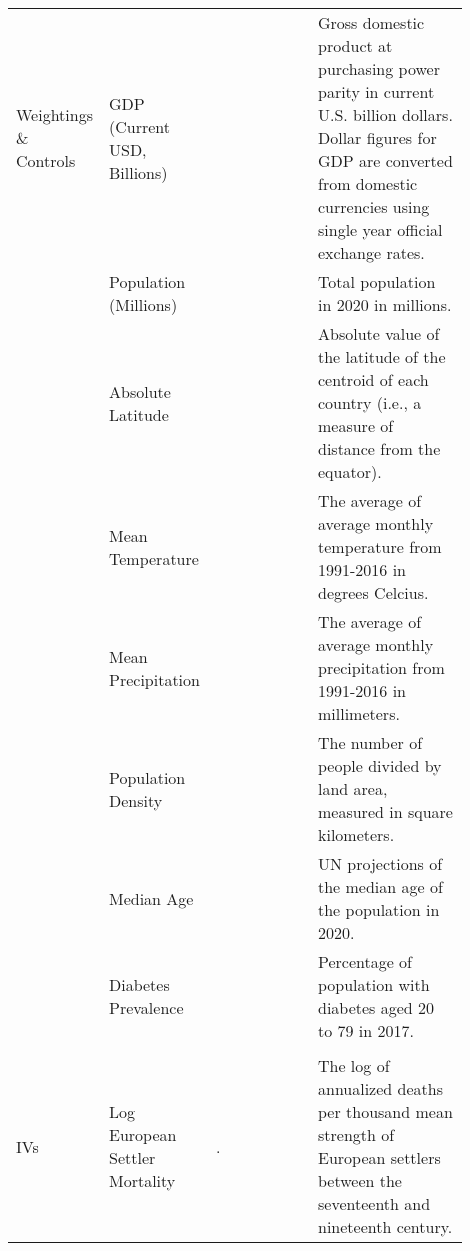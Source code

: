 \begin{table}[!htbp]
\begin{tabularx}{\linewidth}{p{0.07\linewidth} p{0.2\linewidth} p{0.27\linewidth} p{0.36\linewidth}}
    Weightings \& Controls 
    
    & GDP (Current USD, Billions) & \citet{theworldbankgroupGDPCurrentUS2020} & Gross domestic product at purchasing power parity in current U.S. billion dollars. Dollar figures for GDP are converted from domestic currencies using single year official exchange rates. \\ 
    
        & Population (Millions) & \citet{unitednationsdepartmentofeconomicandsocialaffairspopulationdivisionWorldPopulationProspects2019} & Total population in 2020 in millions. \\

    & Absolute Latitude & \citet{GooglePublicData} & Absolute value of the latitude of the centroid of each country (i.e., a measure of distance from the equator).\\
    
    & Mean Temperature & \citet{theworldbankgroupClimateChangeKnowledge2020} & The average of average monthly temperature from 1991-2016 in degrees Celcius. \\
    
    & Mean Precipitation & \citet{theworldbankgroupClimateChangeKnowledge2020} & The average of average monthly precipitation from 1991-2016 in millimeters. \\
    
    & Population Density & \citet{unitednationsdepartmentofeconomicandsocialaffairspopulationdivisionWorldPopulationProspects2019} & The number of people divided by land area, measured in square kilometers. \\
    
    & Median Age & \citet{unitednationsdepartmentofeconomicandsocialaffairspopulationdivisionWorldPopulationProspects2019} & UN projections of the median age of the population in 2020. \\
    
    & Diabetes Prevalence & \citet{internationaldiabetesfederationIDFDiabetesAtlas2019} & Percentage of population with diabetes aged 20 to 79 in 2017. \\ \hline \\[-1.8ex]
    

    IVs & 
    Log European Settler Mortality & \citet{ColonialOriginsReplicationData}. & The log of annualized deaths per thousand mean strength of European settlers between the seventeenth and nineteenth century.\\ %
    

\end{tabularx}
\end{table}
